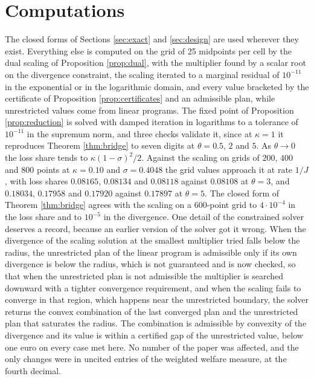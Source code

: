\documentclass[11pt,a4paper]{article}
\theoremstyle{notesplain}
\theoremstyle{notesupright}
\numberwithin{equation}{section}
\begin{document}
\section{Computations}
\label{sec:computations}
The closed forms of Sections \ref{sec:exact} and \ref{sec:design} are used wherever they exist. Everything else is computed on the grid of 25 midpoints per cell by the dual scaling of Proposition \ref{prop:dual}, with the multiplier found by a scalar root on the divergence constraint, the scaling iterated to a marginal residual of $10^{-11}$ in the exponential or in the logarithmic domain, and every value bracketed by the certificate of Proposition \ref{prop:certificates} and an admissible plan, while unrestricted values come from linear programs. The fixed point of Proposition \ref{prop:reduction} is solved with damped iteration in logarithms to a tolerance of $10^{-11}$ in the supremum norm, and three checks validate it, since at $\kappa=1$ it reproduces Theorem \ref{thm:bridge} to seven digits at $\theta=0.5$, $2$ and $5$. As $\theta\to0$ the loss share tends to $\kappa(1-\sigma)^2/2$. Against the scaling on grids of $200$, $400$ and $800$ points at $\kappa=0.10$ and $\sigma=0.4048$ the grid values approach it at rate $1/J$, with loss shares $0.08165$, $0.08134$ and $0.08118$ against $0.08108$ at $\theta=3$, and $0.18034$, $0.17958$ and $0.17920$ against $0.17897$ at $\theta=5$. The closed form of Theorem \ref{thm:bridge} agrees with the scaling on a 600-point grid to $4\cdot10^{-4}$ in the loss share and to $10^{-5}$ in the divergence. One detail of the constrained solver deserves a record, because an earlier version of the solver got it wrong. When the divergence of the scaling solution at the smallest multiplier tried falls below the radius, the unrestricted plan of the linear program is admissible only if its own divergence is below the radius, which is not guaranteed and is now checked, so that when the unrestricted plan is not admissible the multiplier is searched downward with a tighter convergence requirement, and when the scaling fails to converge in that region, which happens near the unrestricted boundary, the solver returns the convex combination of the last converged plan and the unrestricted plan that saturates the radius. The combination is admissible by convexity of the divergence and its value is within a certified gap of the unrestricted value, below one euro on every case met here. No number of the paper was affected, and the only changes were in uncited entries of the weighted welfare measure, at the fourth decimal.
\end{document}
